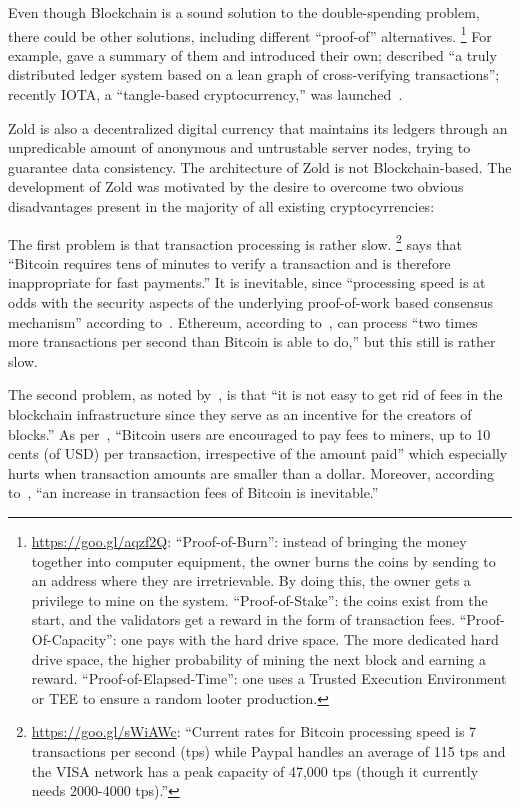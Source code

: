 \documentclass[11pt,oneside]{article}
\begin{document}
Even though Blockchain is a sound solution to the double-spending
problem, there could be other solutions,
including different ``proof-of'' alternatives.%
\footnote{%
  \url{https://goo.gl/aqzf2Q}:
  ``Proof-of-Burn'': instead of bringing the money together into computer equipment,
  the owner burns the coins by sending to an address where they are
  irretrievable. By doing this, the owner gets a privilege to
  mine on the system.
  ``Proof-of-Stake'': the coins exist from the start, and
  the validators get a reward in the form of transaction fees.
  ``Proof-Of-Capacity'': one pays with the hard drive space. The more
  dedicated hard drive space, the higher probability of mining
  the next block and earning a reward.
  ``Proof-of-Elapsed-Time'': one uses a Trusted Execution Environment or TEE
  to ensure a random looter production.
}
For example, \textcite{everaere2010} gave
a summary of them and introduced their own;
\textcite{boyen2016} described
``a truly distributed ledger system based on a lean graph of cross-verifying transactions'';
recently IOTA, a ``tangle-based cryptocurrency,'' was launched~\parencite{popov2017}.

Zold is also a decentralized digital currency that maintains its ledgers
through an unpredicable amount of anonymous and untrustable server nodes, trying to guarantee
data consistency. The architecture of Zold is not Blockchain-based.
The development of Zold was motivated by the desire to overcome
two obvious disadvantages present in the majority of all existing cryptocyrrencies:

The first problem is that transaction processing is rather slow.%
\footnote{%
  \url{https://goo.gl/sWiAWc}:
  ``Current rates for Bitcoin processing
  speed is 7 transactions per second (tps) while Paypal handles
  an average of 115 tps and the VISA
  network has a peak capacity of 47,000 tps (though it currently needs 2000-4000 tps).''
}
\textcite{karame2012} says that ``Bitcoin requires tens of minutes to verify a transaction
and is therefore inappropriate for fast payments.''
It is inevitable, since
``processing speed is at odds with the security aspects of the underlying
proof-of-work based consensus mechanism'' according to~\textcite{kiayias2015}.
Ethereum, according to~\textcite{fekkes2018}, can process
``two times more transactions per second than Bitcoin is able to do,''
but this still is rather slow.

The second problem, as noted by~\textcite{popov2017}, is that ``it is not easy to get rid
of fees in the blockchain infrastructure since they serve
as an incentive for the creators of blocks.''
As per~\textcite{moser2015}, ``Bitcoin users are encouraged to
pay fees to miners, up to 10 cents (of USD) per transaction, irrespective of the
amount paid'' which especially hurts when transaction amounts are smaller than a dollar.
Moreover, according to~\textcite{kaskaloglu2014},
``an increase in transaction fees of Bitcoin is inevitable.''
\end{document}
